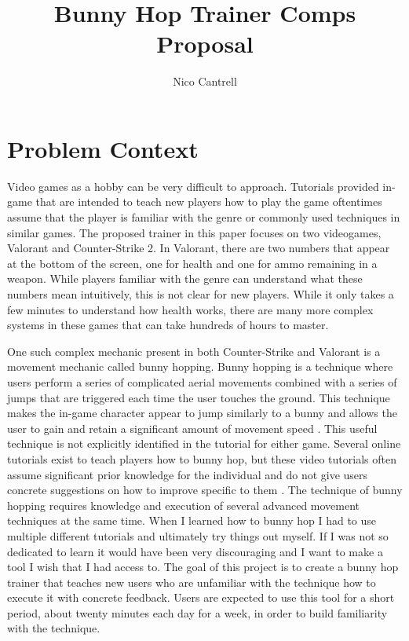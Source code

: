 \documentclass[10pt,twocolumn]{article}
\title{Bunny Hop Trainer Comps Proposal}
\author{Nico Cantrell}
\affiliation{Occidental College}
\begin{document}
\maketitle
\section{Problem Context}

Video games as a hobby can be very difficult to approach. Tutorials provided in-game that are intended to teach new players how to play the game oftentimes assume that the player is familiar with the genre or commonly used techniques in similar games. The proposed trainer in this paper focuses on two videogames, Valorant and Counter-Strike 2. In Valorant, there are two numbers that appear at the bottom of the screen, one for health and one for ammo remaining in a weapon. While players familiar with the genre can understand what these numbers mean intuitively, this is not clear for new players. While it only takes a few minutes to understand how health works, there are many more complex systems in these games that can take hundreds of hours to master. 

One such complex mechanic present in both Counter-Strike and Valorant is a movement mechanic called bunny hopping. Bunny hopping is a technique where users perform a series of complicated aerial movements combined with a series of jumps that are triggered each time the user touches the ground. This technique makes the in-game character appear to jump similarly to a bunny and allows the user to gain and retain a significant amount of movement speed \cite{BunnyHoppingProgrammers}. This useful technique is not explicitly identified in the tutorial for either game. Several online tutorials exist to teach players how to bunny hop, but these video tutorials often assume significant prior knowledge for the individual and do not give users concrete suggestions on how to improve specific to them \cite{QuakeBHopTutorial}. The technique of bunny hopping requires knowledge and execution of several advanced movement techniques at the same time. When I learned how to bunny hop I had to use multiple different tutorials and ultimately try things out myself. If I was not so dedicated to learn it would have been very discouraging and I want to make a tool I wish that I had access to. The goal of this project is to create a bunny hop trainer that teaches new users who are unfamiliar with the technique how to execute it with concrete feedback. Users are expected to use this tool for a short period, about twenty minutes each day for a week, in order to build familiarity with the technique.
\end{document}
